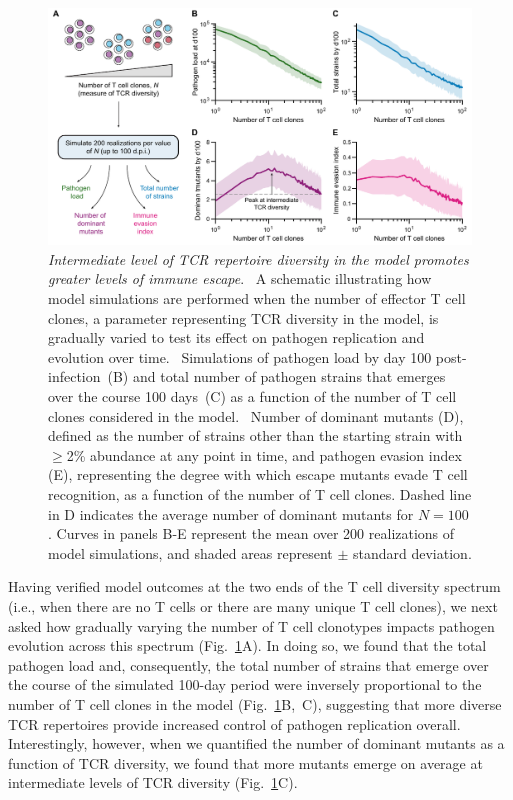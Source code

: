 \begin{figure}[b!]
    \centering
    \includegraphics[width=\textwidth]{Figures/VE/fig4_effectOfN.pdf}
    \caption[Intermediate level of TCR repertoire diversity in the model promotes greater levels of immune escape]{\textit{Intermediate level of TCR repertoire diversity in the model promotes greater levels of immune escape}. %
    ~A schematic illustrating how model simulations are performed when the number of effector T cell clones, a parameter representing TCR diversity in the model, is gradually varied to test its effect on pathogen replication and evolution over time. %
    ~Simulations of pathogen load by day 100 post-infection~(B) and total number of pathogen strains that emerges over the course 100 days~(C) as a function of the number of T cell clones considered in the model. %
    ~Number of dominant mutants (D), defined as the number of strains other than the starting strain with $\geq$2\% abundance at any point in time, and pathogen evasion index (E), representing the degree with which escape mutants evade T cell recognition, as a function of the number of T cell clones. Dashed line in D indicates the average number of dominant mutants for $N=100$. Curves in panels B-E represent the mean over 200 realizations of model simulations, and shaded areas represent $\pm$ standard deviation. %
    }
    \label{fig:VE_effectOfN}
\end{figure}
Having verified model outcomes at the two ends of the T cell diversity spectrum (i.e., when there are no T cells or there are many unique T cell clones), we next asked how gradually varying the number of T cell clonotypes impacts pathogen evolution across this spectrum  (Fig.~\ref{fig:VE_effectOfN}A). In doing so, we found that the total pathogen load and, consequently, the total number of strains that emerge over the course of the simulated 100-day period were inversely proportional to the number of T cell clones in the model (Fig.~\ref{fig:VE_effectOfN}B,~C), suggesting that more diverse TCR repertoires provide increased control of pathogen replication overall. Interestingly, however, when we quantified the number of dominant mutants as a function of TCR diversity, we found that more mutants emerge on average at intermediate levels of TCR diversity (Fig.~\ref{fig:VE_effectOfN}C).

